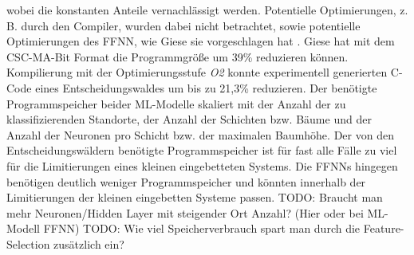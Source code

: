 wobei die konstanten Anteile vernachlässigt werden.
Potentielle Optimierungen, z. B. durch den Compiler, wurden dabei nicht betrachtet,
sowie potentielle Optimierungen des FFNN, wie Giese sie vorgeschlagen hat \cite{gieseThesis}.
Giese hat mit dem CSC-MA-Bit Format die Programmgröße um 39\% reduzieren können.
Kompilierung mit der Optimierungsstufe \textit{O2} konnte experimentell generierten C-Code
eines Entscheidungswaldes um bis zu 21,3\% reduzieren.
\newline
\newline
Der benötigte Programmspeicher beider ML-Modelle skaliert mit der Anzahl der zu klassifizierenden Standorte, der Anzahl der Schichten bzw. Bäume
und der Anzahl der Neuronen pro Schicht bzw. der maximalen Baumhöhe.
Der von den Entscheidungswäldern benötigte Programmspeicher ist für fast alle Fälle zu viel
für die Limitierungen eines kleinen eingebetteten Systems.
Die FFNNs hingegen benötigen deutlich weniger Programmspeicher und könnten innerhalb der Limitierungen der kleinen eingebetten Systeme passen.
\newline
\newline
TODO: Braucht man mehr Neuronen/Hidden Layer mit steigender Ort Anzahl? (Hier oder bei ML-Modell FFNN)
\newline
TODO: Wie viel Speicherverbrauch spart man durch die Feature-Selection zusätzlich ein?

